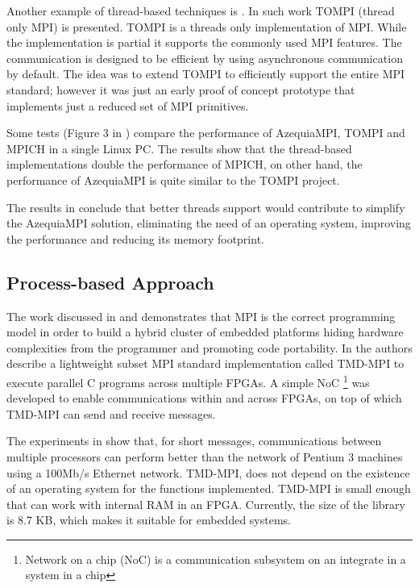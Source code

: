 Another example of thread-based techniques is \cite{Demaine} . In such work
TOMPI (thread only MPI) is presented. TOMPI is a threads only implementation of
MPI. While the implementation is partial it supports the commonly used MPI
features. The communication is designed to be efficient by using asynchronous
communication by default. The idea was to extend TOMPI to efficiently support
the entire MPI standard; however it was just an early proof of concept
prototype that implements just a reduced set of MPI primitives. 

Some tests (Figure 3 in \cite{Gallego}) compare the performance of AzequiaMPI,
TOMPI and MPICH in a single Linux PC. The results show that the thread-based
implementations double the performance of MPICH, on other hand, the performance
of AzequiaMPI is quite similar to the TOMPI project. 

The results in \cite{Gallego} conclude that better threads support would
contribute to simplify the AzequiaMPI solution, eliminating the need of an
operating system, improving the performance and reducing its memory footprint. 

\subsection{Process-based Approach}

The work discussed in \cite{Saldana-Chow} and \cite{Williams} demonstrates that
MPI is the correct programming model in order to build a hybrid cluster of
embedded platforms hiding hardware complexities from the programmer and
promoting code portability. In \cite{Saldana-Chow} the authors describe a
lightweight subset MPI standard implementation called TMD-MPI to execute
parallel C programs across multiple FPGAs. A simple NoC \footnote{Network on a
chip (NoC) is a communication subsystem on an integrate in a system in a chip}
was developed to enable communications within and across FPGAs, on top of which
TMD-MPI can send and receive messages. 

The experiments in \cite{Saldana-Chow}  show that, for short messages,
communications between multiple processors can perform better than the network
of Pentium 3 machines using a 100Mb/s Ethernet network. TMD-MPI, does not
depend on the existence of an operating system for the functions implemented.
TMD-MPI is small enough that can work with internal RAM in an FPGA. Currently,
the size of the library is 8.7 KB, which makes it suitable for embedded
systems.

